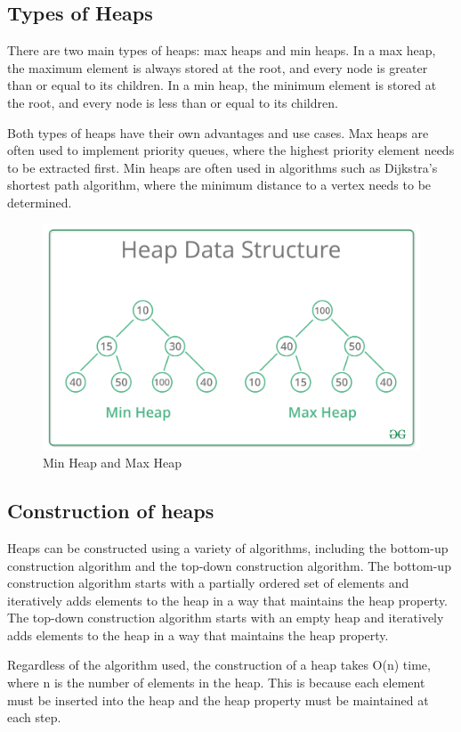 \documentclass[11pt]{article}
\begin{document}
\subsection{Types of Heaps}

There are two main types of heaps: max heaps and min heaps. In a max heap, the maximum element is always stored at the root, and every node is greater than or equal to its children. In a min heap, the minimum element is stored at the root, and every node is less than or equal to its children.

Both types of heaps have their own advantages and use cases. Max heaps are often used to implement priority queues, where the highest priority element needs to be extracted first. Min heaps are often used in algorithms such as Dijkstra's shortest path algorithm, where the minimum distance to a vertex needs to be determined.

\begin{figure}[H]
    \centering
    \includegraphics[width=.45\textwidth]{MinHeapAndMaxHeap1.png}
    \caption{Min Heap and Max Heap}
\end{figure}

\subsection{Construction of heaps}

Heaps can be constructed using a variety of algorithms, including the bottom-up construction algorithm and the top-down construction algorithm. The bottom-up construction algorithm starts with a partially ordered set of elements and iteratively adds elements to the heap in a way that maintains the heap property. The top-down construction algorithm starts with an empty heap and iteratively adds elements to the heap in a way that maintains the heap property.

Regardless of the algorithm used, the construction of a heap takes O(n) time, where n is the number of elements in the heap. This is because each element must be inserted into the heap and the heap property must be maintained at each step.
\end{document}
